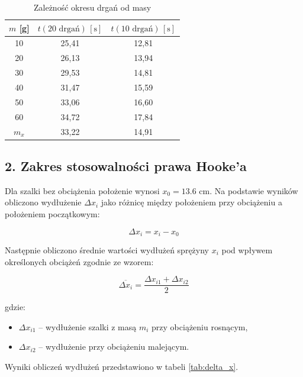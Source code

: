 \documentclass[a4paper,12pt]{article}
\begin{document}
\begin{table}[H]
    \centering
    \begin{tabular}{|c|c|c|}
        \hline
        $m$ [g] & $t(20 \text{ drgań})\,[\text{s}]$ & $t(10 \text{ drgań})\,[\text{s}]$ \\
        \hline
        10 & 25,41 & 12,81 \\
        20 & 26,13 & 13,94 \\
        30 & 29,53 & 14,81 \\
        40 & 31,47 & 15,59 \\
        50 & 33,06 & 16,60 \\
        60 & 34,72 & 17,84 \\
        $m_x$ & 33,22 & 14,91 \\
        \hline
    \end{tabular}
    \caption{Zależność okresu drgań od masy}
\end{table}



\subsection{2.  Zakres stosowalności prawa Hooke'a}


Dla szalki bez obciążenia położenie wynosi $x_0 = 13.6$ cm.
Na podstawie wyników obliczono wydłużenie $\Delta x_i$ jako różnicę między położeniem przy obciążeniu a położeniem początkowym:

\begin{equation}
    \label{eq:wydluzenie}
    \Delta x_i = x_i - x_0
\end{equation}

Następnie obliczono średnie wartości wydłużeń sprężyny \(x_i\) pod wpływem określonych obciążeń zgodnie ze wzorem:

\begin{equation*}
    \overline{\Delta x_i} = \frac{\Delta x_{i1} + \Delta x_{i2}}{2}
\end{equation*}

gdzie:
\begin{itemize}
    \setlength{\itemsep}{0em}
    \item \(\Delta x_{i1}\) -- wydłużenie szalki z masą \(m_i\) przy obciążeniu rosnącym,
    \item \(\Delta x_{i2}\) -- wydłużenie przy obciążeniu malejącym.
\end{itemize}

Wyniki obliczeń wydłużeń przedstawiono w tabeli \ref{tab:delta_x}.
\end{document}
